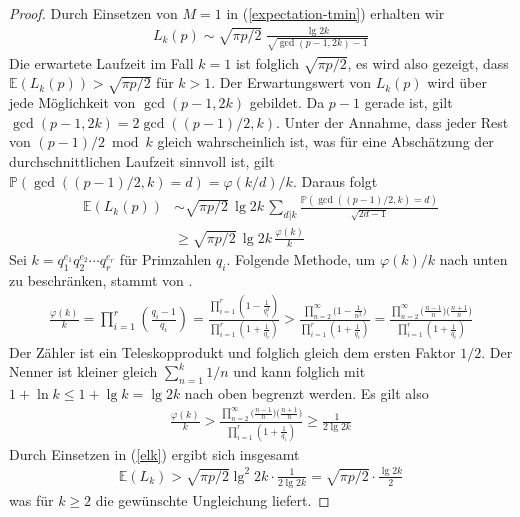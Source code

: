 \documentclass[a4paper, 10pt, ngerman]{article}
\newcommand{\E}{\mathbb{E}}
\renewcommand{\P}{\mathbb{P}}
\begin{document}
\begin{proof}
    Durch Einsetzen von $M = 1$ in (\ref{expectation-tmin}) erhalten wir
    \begin{align*}
        L_k(p) \sim \sqrt {\pi p / 2} \; \frac {\lg 2k} {\sqrt{\gcd(p - 1, 2k) - 1}}
    \end{align*}
    Die erwartete Laufzeit im Fall $k = 1$ ist folglich $\sqrt{\pi p/2}$, es wird also gezeigt, dass $\E(L_k(p)) > \sqrt{\pi p / 2}$ für $k > 1$. Der Erwartungswert von $L_k(p)$ wird über jede Möglichkeit von $\gcd(p - 1, 2k)$ gebildet. Da $p - 1$ gerade ist, gilt $\gcd(p - 1, 2k) = 2 \gcd((p - 1)/2, k)$. Unter der Annahme, dass jeder Rest von $(p - 1)/2 \bmod k$ gleich wahrscheinlich ist, was für eine Abschätzung der durchschnittlichen Laufzeit sinnvoll ist, gilt $\mathbb{P}(\gcd((p - 1)/2, k) = d) = \varphi(k/d)/k$. Daraus folgt
    \begin{align}
        \E(L_k(p))
         & \sim \sqrt{\pi p / 2} \, \lg 2k \, \sum_{d | k} \frac {\P(\gcd((p - 1)/2, k) = d)} { \sqrt {2d - 1}} \nonumber \\
         & \ge \sqrt{\pi p / 2} \, \lg 2k \, \frac {\varphi(k)} k \label{elk}
    \end{align}
    Sei $k = q_1^{e_1} q_2^{e_2} \cdots q_r^{e_r}$ für Primzahlen $q_i$. Folgende Methode, um $\varphi(k)/k$ nach unten zu beschränken, stammt von \cite{phi}.
    \begin{align*}
        \frac {\varphi(k)} k = \prod_{i = 1}^r \left ( \frac {q_i - 1} {q_i} \right )
        = \frac{\prod_{i = 1}^r \left ( 1 - \frac 1 {q_i^2} \right )}{\prod_{i = 1}^r \left ( 1 + \frac 1 {q_i} \right )}
        > \frac {\prod_{n = 2}^\infty \Big ( 1 - \frac 1 {n^2} \Big )} {\prod_{i = 1}^r \left ( 1 + \frac 1 {q_i} \right )}
        = \frac {\prod_{n = 2}^\infty \Big ( \frac {n - 1} {n} \Big ) \Big ( \frac {n + 1} n \Big )} {\prod_{i = 1}^r \left ( 1 + \frac 1 {q_i} \right )}
    \end{align*}
    Der Zähler ist ein Teleskopprodukt und folglich gleich dem ersten Faktor $1/2$. Der Nenner ist kleiner gleich $\sum_{n = 1}^{k} 1/n$ und kann folglich mit $1 + \ln k \le 1 + \lg k = \lg 2k$ nach oben begrenzt werden. Es gilt also
    \begin{align*}
        \frac {\varphi(k)} k
        > \frac {\prod_{n = 2}^\infty \Big ( \frac {n - 1} {n} \Big ) \Big ( \frac {n + 1} n \Big )} {\prod_{i = 1}^r \left ( 1 + \frac 1 {q_i} \right )}
        \ge \frac {1}{2\lg 2k}
    \end{align*}
    Durch Einsetzen in (\ref{elk}) ergibt sich insgesamt
    \begin{align*}
        \E(L_k) > \sqrt{\pi p / 2} \lg^2 2k \cdot \frac {1} {2 \lg 2k} = \sqrt {\pi p / 2} \cdot \frac {\lg 2k} {2}
    \end{align*}
    was für $k \ge 2$ die gewünschte Ungleichung liefert.
\end{proof}
\end{document}
